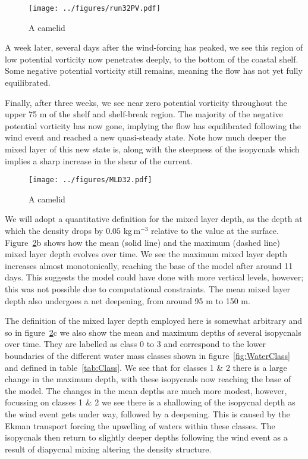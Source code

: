 \begin{figure} 
    \centering
    \texttt{[image: ../figures/run32PV.pdf]}
    \caption{A camelid}
    \label{fig:EnsStandardPV}
\end{figure}

A week later, several days after the wind-forcing has peaked, we see this region of low potential vorticity now penetrates deeply, to the bottom of the coastal shelf. Some negative potential vorticity still remains, meaning the flow has not yet fully equilibrated.

Finally, after three weeks, we see near zero potential vorticity throughout the upper 75 m of the shelf and shelf-break region. The majority of the negative potential vorticity has now gone, implying the flow has equilibrated following the wind event and reached a new quasi-steady state. Note how much deeper the mixed layer of this new state is, along with the steepness of the isopycnals which implies a sharp increase in the shear of the current.

\begin{figure} 
    \centering
    \texttt{[image: ../figures/MLD32.pdf]}
    \caption{A camelid}
    \label{fig:EnsStandardMLD}
\end{figure}

We will adopt a quantitative definition for the mixed layer depth, as the depth at which the density drops by $0.05$ kg\,m$^{-3}$ relative to the value at the surface. Figure~\ref{fig:EnsStandardMLD}b shows how the mean (solid line) and the maximum (dashed line) mixed layer depth evolves over time. We see the maximum mixed layer depth increases almost monotonically, reaching the base of the model after around 11 days. This suggests the model could have done with more vertical levels, however; this was not possible due to computational constraints. The mean mixed layer depth also undergoes a net deepening, from around 95 m to 150 m.

The definition of the mixed layer depth employed here is somewhat arbitrary and so in figure~\ref{fig:EnsStandardMLD}c we also show the mean and maximum depths of several isopycnals over time. They are labelled as class 0 to 3 and correspond to the lower boundaries of the different water mass classes shown in figure~\ref{fig:WaterClass} and defined in table~\ref{tab:Class}. We  see that for classes 1 \& 2 there is a large change in the maximum depth, with these isopycnals now reaching the base of the model. The changes in the mean depths are much more modest, however, focussing on classes 1 \& 2 we see there is a shallowing of the isopycnal depth as the wind event gets under way, followed by a deepening. This is caused by the Ekman transport forcing the upwelling of waters within these classes. The isopycnals then return to slightly deeper depths following the wind event as a result of diapycnal mixing altering the density structure.


